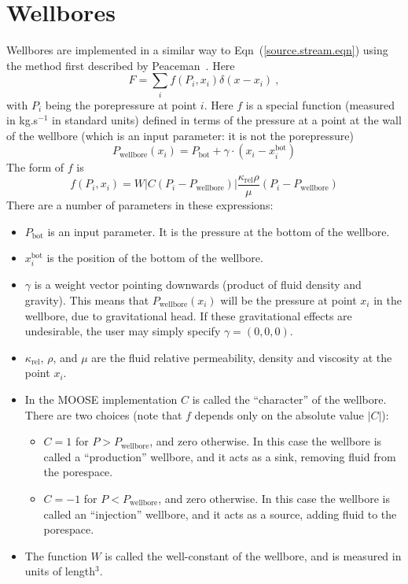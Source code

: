\documentclass[]{scrreprt}
\begin{document}
\section{Wellbores}

Wellbores are implemented in a similar way to
Eqn~(\ref{source.stream.eqn}) using the method first described by
Peaceman~\cite{peaceman1983}.  Here
\begin{equation}
F = \sum_{i}f(P_{i}, x_{i})\delta(x - x_{i}) \ ,
\end{equation}
with $P_{i}$ being the porepressure at point $i$.  Here $f$ is a
special function (measured in kg.s$^{-1}$ in standard
units) defined in terms of the pressure at a
point at the wall of the wellbore (which is an input parameter: it is
not the porepressure)
\begin{equation}
P_{\mathrm{wellbore}}(x_{i}) = P_{\mathrm{bot}} + \gamma \cdot (x_{i} -
x_{i}^{\mathrm{bot}})
\end{equation}
The form of $f$ is
\begin{equation}
f(P_{i}, x_{i}) =
W \left|C(P_{i}-P_{\mathrm{wellbore}})\right|
\frac{\kappa_{\mathrm{rel}}\rho}{\mu}(P_{i} - P_{\mathrm{wellbore}})
\end{equation}
There are a number of parameters in these expressions:
\begin{itemize}
\item $P_{\mathrm{bot}}$ is an input parameter.  It is the pressure at
  the bottom of the wellbore.
\item $x_{i}^{\mathrm{bot}}$ is the position of the bottom of the wellbore.
\item $\gamma$ is a weight vector pointing downwards (product of fluid
  density and gravity).  This means that
  $P_{\mathrm{wellbore}}(x_{i})$ will be the pressure at point $x_{i}$
  in the wellbore, due to gravitational head.  If these
  gravitational effects are undesirable, the user may simply specify
  $\gamma = (0,0,0)$.
\item $\kappa_{\mathrm{rel}}$, $\rho$, and $\mu$ are the fluid
  relative permeability, density and viscosity at the point $x_{i}$.
\item In the MOOSE implementation $C$ is called the ``character'' of
  the wellbore.   There are two choices (note that $f$ depends only on
  the absolute value $|C|$):
\begin{itemize}
\item $C=1$ for $P>P_{\mathrm{wellbore}}$, and zero otherwise.  In
  this case the wellbore is called a ``production'' wellbore, and it
  acts as a sink, removing fluid from the porespace.
\item $C=-1$ for $P<P_{\mathrm{wellbore}}$, and zero otherwise.  In
  this case the wellbore is called an ``injection'' wellbore, and it
  acts as a source, adding fluid to the porespace.
\end{itemize}
\item The function $W$ is called the well-constant of the wellbore, and is
measured in units of length$^{3}$.
\end{itemize}
\end{document}
